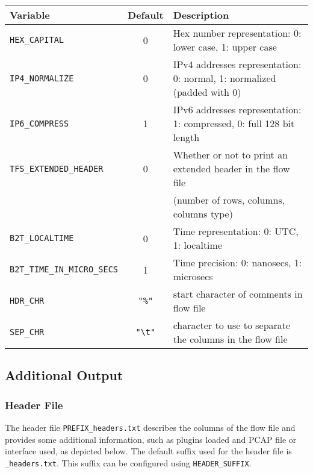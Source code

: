 \documentclass[documentation]{subfiles}
\begin{document}
\begin{longtable}{lcl}
    \toprule
    {\bf Variable} & {\bf Default} & {\bf Description}\\
    \midrule\endhead%
    {\tt HEX\_CAPITAL}          & 0 & Hex number representation: 0: lower case, 1: upper case\\
    {\tt IP4\_NORMALIZE}        & 0 & IPv4 addresses representation: 0: normal, 1: normalized (padded with 0)\\
    {\tt IP6\_COMPRESS}         & 1 & IPv6 addresses representation: 1: compressed, 0: full 128 bit length \\
    {\tt TFS\_EXTENDED\_HEADER} & 0 & Whether or not to print an extended header in the flow file\\
                                &   & (number of rows, columns, columns type)\\
    {\tt B2T\_LOCALTIME}        & 0 & Time representation: 0: UTC, 1: localtime\\
    {\tt B2T\_TIME\_IN\_MICRO\_SECS} & 1 & Time precision: 0: nanosecs, 1: microsecs\\
    {\tt HDR\_CHR} & {\tt "\%"} & start character of comments in flow file\\
    {\tt SEP\_CHR} & {\tt "\textbackslash{}t"} & character to use to separate the columns in the flow file\\
    \bottomrule
\end{longtable}

\subsection{Additional Output}

\subsubsection{Header File}\label{s:tfsHeader}
The header file {\tt PREFIX\_headers.txt} describes the columns of the flow file and provides some additional information, such as plugins loaded and PCAP file or interface used, as depicted below. The default suffix used for the header file is {\tt \_headers.txt}. This suffix can be configured using {\tt HEADER\_SUFFIX}.
\end{document}
